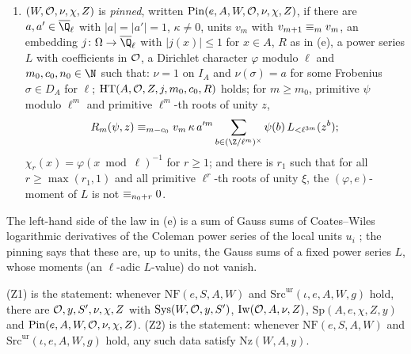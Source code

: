 \begin{definition}
\begin{enumerate}[label=(\alph*)]
\begin{itemize}
    $s(u_i^{1/\ell^{m-c_0}})=\zeta_m^{\ell^{c_0}k_i}u_i^{1/\ell^{m-c_0}}$ and $Z_m(s,1)\katoeq{m-c_0}\sum_io_i\katorep{k_i}$;
  \item (Coates--Wiles derivatives) for every primitive Dirichlet character $\psi$ modulo $\ell^m$,
    \[
      \sum_{b\in(\Z/\ell^m)^\times}\psi(b)\sum_io_i\,j\Bigl(\frac{\zeta_m^bP_i'(\zeta_m^b)}{P_i(\zeta_m^b)}\Bigr)\katoeq{m-c_0}R_m\bigl(\psi,j(\zeta_m)\bigr).
    \]
  \end{itemize}
\item $(W,\mathcal{O},\nu,\chi,Z)$ is \emph{pinned}, written $\mathrm{Pin}(e,A,W,\mathcal{O},\nu,\chi,Z)$, if there are $a,a'\in\katoQlb$ with
  $|a|=|a'|=1$, $\kappa\ne0$, units $v_m$ with $v_{m+1}\equiv_{m}v_m$, an embedding $j\colon\Omega\to\katoQlb$ with $|j(x)|\le1$ for
  $x\in A$, $R$ as in (e), a power series $L$ with coefficients in $\mathcal{O}$, a Dirichlet character $\varphi$ modulo $\ell$ and
  $m_0,c_0,n_0\in\N$ such that: $\nu=1$ on $I_A$ and $\nu(\sigma)=a$ for some Frobenius $\sigma\in D_A$ for $\ell$;
  $\mathrm{HT}(A,\mathcal{O},Z,j,m_0,c_0,R)$ holds; for $m\ge m_0$, primitive $\psi$ modulo $\ell^m$ and primitive $\ell^m$-th roots of unity
  $z$,
  \[
    R_m(\psi,z)\katoeq{m-c_0}v_m\,\kappa\,a'^m\sum_{b\in(\Z/\ell^m)^\times}\psi(b)\,L_{<\ell^{3m}}(z^b);
  \]
  $\chi_r(x)=\varphi(x\bmod\ell)^{-1}$ for $r\ge1$; and there is $r_1$ such that for all $r\ge\max(r_1,1)$ and all primitive
  $\ell^r$-th roots of unity $\xi$, the $(\varphi,e)$-moment of $L$ is not $\equiv_{n_0+r}0$.
\end{enumerate}
\end{definition}

The left-hand side of the law in (e) is a sum of Gauss sums of Coates--Wiles logarithmic derivatives of the
Coleman power series of the local units $u_i$ \cite{CoatesWiles1977,Coleman1979}; the pinning says that these are,
up to units, the Gauss sums of a fixed power series $L$, whose moments (an $\ell$-adic $L$-value) do not vanish.

\begin{definition}\label{pf:kato:def:halves}
\textup{(Z1)} is the statement: whenever $\mathrm{NF}(e,S,A,W)$ and $\mathrm{Src}^{\mathrm{ur}}(\iota,e,A,W,g)$ hold, there are
$\mathcal{O},y,S',\nu,\chi,Z$ with $\mathrm{Sys}(W,\mathcal{O},y,S')$, $\mathrm{Iw}(\mathcal{O},A,\nu,Z)$, $\mathrm{Sp}(A,e,\chi,Z,y)$ and
$\mathrm{Pin}(e,A,W,\mathcal{O},\nu,\chi,Z)$. \textup{(Z2)} is the statement: whenever $\mathrm{NF}(e,S,A,W)$ and
$\mathrm{Src}^{\mathrm{ur}}(\iota,e,A,W,g)$ hold, any such data satisfy $\mathrm{Nz}(W,A,y)$.
\end{definition}

